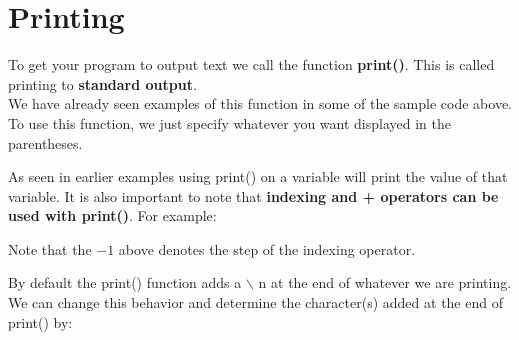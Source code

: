 \documentclass[13pt,a4paper,oneside]{book}
\begin{document}
\section{Printing}%
\label{sec:Printing}
To get your program to output text we call the function \textbf{print()}. This is called printing to \textbf{standard output}. \\
We have already seen examples of this function in some of the sample code above. 
To use this function, we just specify whatever you want displayed in the parentheses.
	
	\begin{tcolorbox}[title=Output,center title,hbox]
	\end{tcolorbox}
As seen in earlier examples using print() on a variable will print the value of that variable. It is also important to note that \textbf{indexing and + operators can be used with print()}. For example:
	
	\begin{tcolorbox}[title=Output,center title,hbox]
	\end{tcolorbox}
Note that the $ -1 $ above denotes the step of the indexing operator.
	
By default the print() function adds a $\backslash$ n at the end of whatever we are printing.\\
We can change this behavior and determine the character(s) added at the end of print() by:
	
	\begin{tcolorbox}[title=Output,center title,hbox]
	\end{tcolorbox}
\end{document}
